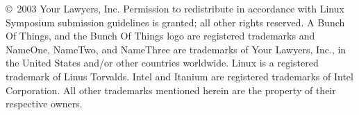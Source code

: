 
\begin{small}
\copyright ~2003 Your Lawyers, Inc. 
Permission to redistribute in accordance with Linux Symposium
submission guidelines is granted; all other rights reserved.
A Bunch Of Things, and the Bunch Of Things logo are
registered trademarks and
NameOne, NameTwo, and NameThree are trademarks of Your Lawyers, Inc.,
in the United States and/or other countries worldwide.
Linux is a registered trademark of Linus Torvalds.
Intel and Itanium are registered trademarks 
of Intel Corporation.
All other trademarks mentioned herein are the property of their
respective owners. 
\end{small}
